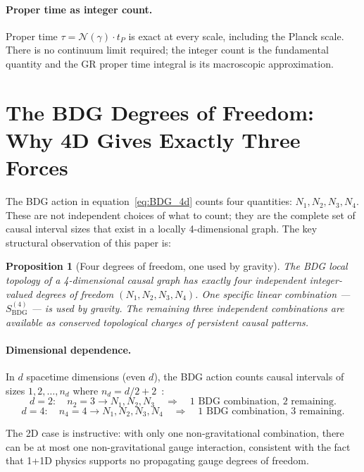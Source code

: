\documentclass[11pt,a4paper]{article}
\newtheorem{proposition}[theorem]{Proposition}
\newcommand{\SBDG}{S_{\mathrm{BDG}}}
\begin{document}
\paragraph{Proper time as integer count.}
Proper time $\tau = \mathcal{N}(\gamma) \cdot t_P$ is exact at every scale,
including the Planck scale. There is no continuum limit required; the integer
count is the fundamental quantity and the GR proper time integral is its
macroscopic approximation.

\section{The BDG Degrees of Freedom: Why 4D Gives Exactly Three Forces}
\label{sec:four_dof}

The BDG action in equation~\eqref{eq:BDG_4d} counts four quantities: $N_1, N_2,
N_3, N_4$. These are not independent choices of what to count; they are the
complete set of causal interval sizes that exist in a locally 4-dimensional
graph. The key structural observation of this paper is:

\begin{proposition}[Four degrees of freedom, one used by gravity]
\label{prop:dof}
The BDG local topology of a 4-dimensional causal graph has exactly four
independent integer-valued degrees of freedom $(N_1, N_2, N_3, N_4)$.
One specific linear combination --- $\SBDG^{(4)}$ --- is used by gravity.
The remaining three independent combinations are available as conserved
topological charges of persistent causal patterns.
\end{proposition}

\paragraph{Dimensional dependence.}
In $d$ spacetime dimensions (even $d$), the BDG action counts causal intervals
of sizes $1, 2, \ldots, n_d$ where $n_d = d/2 + 2$~\citep{Benincasa2010}:
\begin{equation}
  d = 2:\quad n_2 = 3 \to N_1, N_2, N_3
  \quad\Rightarrow\quad \text{1 BDG combination, 2 remaining.}
\end{equation}
\begin{equation}
  d = 4:\quad n_4 = 4 \to N_1, N_2, N_3, N_4
  \quad\Rightarrow\quad \text{1 BDG combination, 3 remaining.}
\end{equation}

The 2D case is instructive: with only one non-gravitational combination,
there can be at most one non-gravitational gauge interaction, consistent
with the fact that 1+1D physics supports no propagating gauge degrees of freedom.
\end{document}
